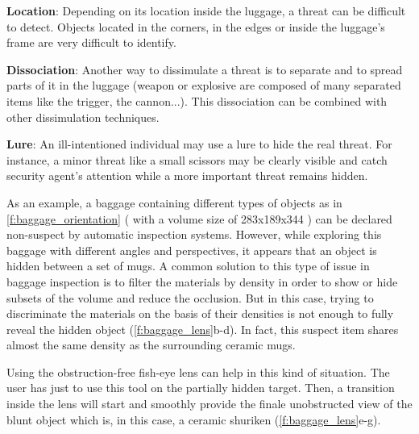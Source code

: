 \textbf{Location}: Depending on its location inside the luggage, a threat can be difficult to detect. Objects located in the corners, in the edges or inside the luggage’s frame are very difficult to identify.

\textbf{Dissociation}: Another way to dissimulate a threat is to separate and to spread parts of it in the luggage (weapon or explosive are composed of many separated items like the trigger, the cannon...). This dissociation can be combined with other dissimulation techniques.

\textbf{Lure}: An ill-intentioned individual may use a lure to hide the real threat. For instance, a minor threat like a small scissors may be clearly visible and catch security agent’s attention while a more important threat remains hidden.

As an example, a baggage containing different types of objects as in \autoref{f:baggage_orientation} ( with a volume size of 283x189x344 ) can be declared non-suspect by automatic inspection systems. However, while exploring this baggage with different angles and perspectives, it appears that an object is hidden between a set of mugs. A common solution to this type of issue in baggage inspection is to filter the materials by density in order to show or hide subsets of the volume and reduce the occlusion. But in this case, trying to discriminate the materials on the basis of their densities is not enough to fully reveal the hidden object (\autoref{f:baggage_lens}b-d). In fact, this suspect item shares almost the same density as the surrounding ceramic mugs. 

Using the obstruction-free fish-eye lens can help in this kind of situation. The user has just to use this tool on the partially hidden target. Then, a transition inside the lens will start and smoothly provide the finale unobstructed view of the blunt object which is, in this case, a ceramic shuriken (\autoref{f:baggage_lens}e-g). 



